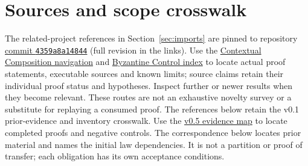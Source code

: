 \documentclass[11pt]{article}
\newcommand{\repo}[2]{\href{https://github.com/eternal-november/eos-research-programmes/blob/4359a8a1484498b9c46d8e58a0112448a1fba06b/projects/#1}{#2}}
\begin{document}
\section{Sources and scope crosswalk}\label{sec:sources}
The related-project references in Section~\ref{sec:imports} are pinned to repository \href{https://github.com/eternal-november/eos-research-programmes/commit/4359a8a1484498b9c46d8e58a0112448a1fba06b}{commit \texttt{4359a8a14844}} (full revision in the links). Use the \repo{contextual-composition/NAVIGATION.md}{Contextual Composition navigation} and \repo{byzantine-control/README.md}{Byzantine Control index} to locate actual proof statements, executable sources and known limits; source claims retain their individual proof status and hypotheses. Inspect further or newer results when they become relevant. These routes are not an exhaustive novelty survey or a substitute for replaying a consumed proof. The references below retain the v0.1 prior-evidence and inventory crosswalk.
Use the \href{https://github.com/eternal-november/eos-research-programmes/blob/main/projects/swarm-coordination/research/COMPLETION.md}{v0.5 evidence map} to locate completed proofs and negative controls. The correspondence below locates prior material and names the initial law dependencies. It is not a partition or proof of transfer; each obligation has its own acceptance conditions.
\end{document}
